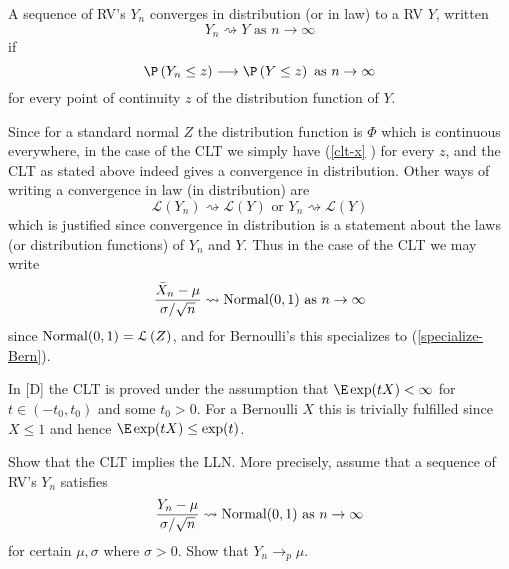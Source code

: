 \begin{definition}
\label{def-converg-in-law} A sequence of RV's $Y_{n}$ converges in
distribution (or in law) to a RV $Y$, written 
\begin{equation*}
Y_{n}\rightsquigarrow Y\text{ as }n\rightarrow \infty
\end{equation*}%
if 
\begin{equation}
\P \left( Y_{n}\leq z\right) \longrightarrow \P \left( Y\leq z\right) 
\text{ as }n\rightarrow \infty  \label{clt-x}
\end{equation}%
for every point of continuity $z$ of the distribution function of $Y$.
\end{definition}

Since for a standard normal $Z$ the distribution function is $\Phi $ which
is continuous everywhere, in the case of the CLT we simply have (\ref{clt-x}%
) for every $z$, and the CLT as stated above indeed gives a convergence in
distribution. Other ways of writing a convergence in law (in distribution)
are 
\begin{equation*}
\mathcal{L}\left( Y_{n}\right) \rightsquigarrow \mathcal{L}\left( Y\right) 
\text{ or }Y_{n}\rightsquigarrow \mathcal{L}\left( Y\right)
\end{equation*}%
which is justified since convergence in distribution is a statement about
the laws (or distribution functions) of $Y_{n}$ and $Y$. Thus in the case of
the CLT we may write 
\begin{equation*}
\frac{\bar{X}_{n}-\mu }{\sigma /\sqrt{n}}\rightsquigarrow \normal(0,1)\text{ as }%
n\rightarrow \infty
\end{equation*}%
since $\mbox{{\rm Normal}}(0,1)=\mathcal{L}\left( Z\right) $, and for Bernoulli's this
specializes to (\ref{specialize-Bern}).

In [D] the CLT is proved under the assumption that $\E\exp (tX)<\infty $ for $%
t\in \left( -t_{0},t_{0}\right) $ and some $t_{0}>0$. For a Bernoulli $X$
this is trivially fulfilled since $X\leq 1$ and hence $\E\exp (tX)\leq \exp
(t)$. \bigskip

\begin{Exercise}[title={CLT implies LLN},label={CLTImpliesLLN}]
Show that the CLT implies the LLN. More precisely, assume
that a sequence of RV's $Y_{n}$ satisfies 
\begin{equation*}
\frac{Y_{n}-\mu }{\sigma /\sqrt{n}}\rightsquigarrow \normal(0,1)\text{ as }%
n\rightarrow \infty
\end{equation*}%
for certain $\mu ,\sigma $ where $\sigma >0$. Show that $Y_{n}%
\longrightarrow _{p}\mu $. \bigskip \bigskip
\end{Exercise}

